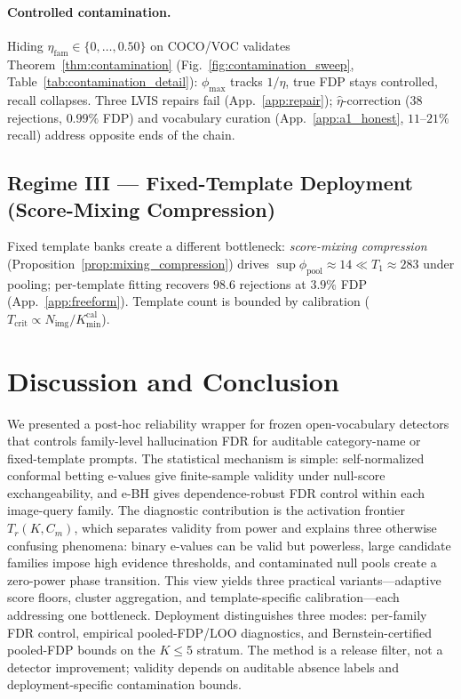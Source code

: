 \documentclass{article}
\theoremstyle{remark}
\newcommand{\1}{\mathbf{1}}
\begin{document}
\paragraph{Controlled contamination.}
Hiding $\eta_{\mathrm{fam}}\!\in\!\{0,\ldots,0.50\}$ on COCO/VOC
validates Theorem~\ref{thm:contamination}
(Fig.~\ref{fig:contamination_sweep}, Table~\ref{tab:contamination_detail}):
$\phi_{\max}$ tracks $1/\eta$, true FDP stays controlled, recall
collapses. Three LVIS repairs fail (App.~\ref{app:repair});
$\hat\eta$-correction ($38$ rejections, $0.99\%$ FDP) and vocabulary
curation (App.~\ref{app:a1_honest}, $11$--$21\%$ recall) address
opposite ends of the chain.

\subsection{Regime III --- Fixed-Template Deployment (Score-Mixing Compression)}

Fixed template banks create a different bottleneck:
\emph{score-mixing compression} (Proposition~\ref{prop:mixing_compression})
drives $\sup\phi_{\mathrm{pool}}\!\approx\!14\!\ll\!T_1\!\approx\!283$
under pooling; per-template fitting recovers $98.6$ rejections at
$3.9\%$ FDP (App.~\ref{app:freeform}). Template count is bounded by
calibration ($T_{\mathrm{crit}}\!\propto\!N_{\mathrm{img}}/K_{\min}^{\mathrm{cal}}$).

\section{Discussion and Conclusion}
\label{sec:discussion}

We presented a post-hoc reliability wrapper for frozen
open-vocabulary detectors that controls family-level hallucination
FDR for auditable category-name or fixed-template prompts. The
statistical mechanism is simple: self-normalized conformal betting
e-values give finite-sample validity under null-score
exchangeability, and e-BH gives dependence-robust FDR control within
each image-query family. The diagnostic contribution is the
activation frontier $T_r(K,C_m)$, which separates validity from
power and explains three otherwise confusing phenomena: binary
e-values can be valid but powerless, large candidate families
impose high evidence thresholds, and contaminated null pools create
a zero-power phase transition. This view yields three practical
variants---adaptive score floors, cluster aggregation, and
template-specific calibration---each addressing one bottleneck.
Deployment distinguishes three modes: per-family FDR control,
empirical pooled-FDP/LOO diagnostics, and Bernstein-certified
pooled-FDP bounds on the $K\!\le\!5$ stratum. The method is a
release filter, not a detector improvement; validity depends on
auditable absence labels and deployment-specific contamination bounds.
\end{document}
